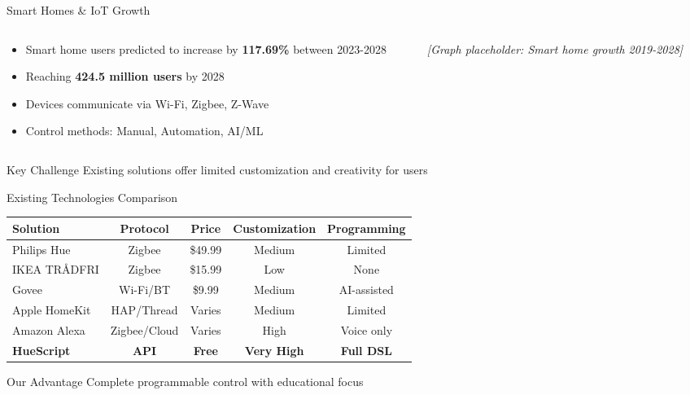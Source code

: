 \documentclass{beamer}
\begin{document}
\begin{frame}{Smart Homes \& IoT Growth}
\begin{columns}
\begin{column}{0.6\textwidth}
\begin{itemize}
    \item Smart home users predicted to increase by \textbf{117.69\%} between 2023-2028
    \item Reaching \textbf{424.5 million users} by 2028
    \item Devices communicate via Wi-Fi, Zigbee, Z-Wave
    \item Control methods: Manual, Automation, AI/ML
\end{itemize}
\end{column}
\begin{column}{0.4\textwidth}
\begin{center}
\textit{[Graph placeholder: Smart home growth 2019-2028]}
\end{center}
\end{column}
\end{columns}

\begin{block}{Key Challenge}
Existing solutions offer limited customization and creativity for users
\end{block}
\end{frame}

\begin{frame}{Existing Technologies Comparison}
\begin{table}[h]
\centering
\scriptsize
\begin{tabular}{|l|c|c|c|c|}
\hline
\textbf{Solution} & \textbf{Protocol} & \textbf{Price} & \textbf{Customization} & \textbf{Programming} \\
\hline
Philips Hue & Zigbee & \$49.99 & Medium & Limited \\
\hline
IKEA TRÅDFRI & Zigbee & \$15.99 & Low & None \\
\hline
Govee & Wi-Fi/BT & \$9.99 & Medium & AI-assisted \\
\hline
Apple HomeKit & HAP/Thread & Varies & Medium & Limited \\
\hline
Amazon Alexa & Zigbee/Cloud & Varies & High & Voice only \\
\hline
\textbf{HueScript} & \textbf{API} & \textbf{Free} & \textbf{Very High} & \textbf{Full DSL} \\
\hline
\end{tabular}
\end{table}

\begin{block}{Our Advantage}
Complete programmable control with educational focus
\end{block}
\end{frame}
\end{document}
